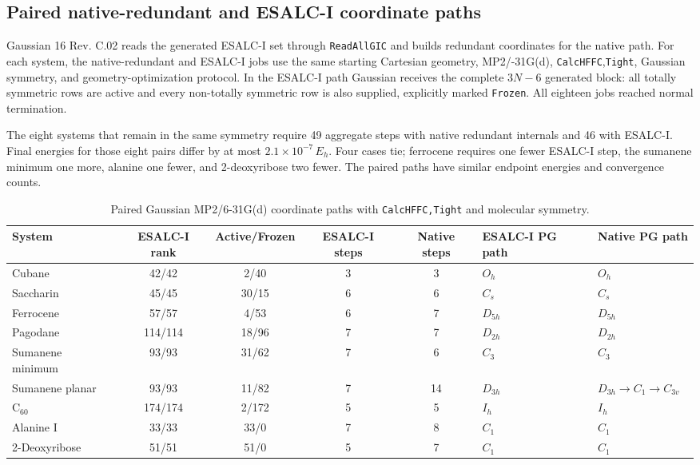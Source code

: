 \documentclass[10pt]{article}
\begin{document}
{\subsection{Paired native-redundant and ESALC-I coordinate paths}

Gaussian 16 Rev. C.02 reads the generated ESALC-I set through
\texttt{ReadAllGIC} and builds redundant coordinates for the native path.  For each
system, the native-redundant and ESALC-I jobs use the same
starting Cartesian geometry, MP2/-31G(d),
\texttt{CalcHFFC},\texttt{Tight}, Gaussian
symmetry, and geometry-optimization protocol.  In the ESALC-I path Gaussian receives the complete \(3N-6\) generated block: all totally symmetric
rows are active and every non-totally symmetric row is also supplied,
explicitly marked \texttt{Frozen}.  All eighteen jobs reached normal termination.

The eight systems that remain in the same symmetry require 49 aggregate steps
with native redundant internals and 46 with ESALC-I.
Final energies for those eight pairs differ by at most
\(2.1\times10^{-7}\,E_h\).  Four cases tie; ferrocene requires one fewer ESALC-I
step, the sumanene minimum one more, alanine one fewer, and 2-deoxyribose two fewer.
The paired paths have similar endpoint energies and convergence counts.

\begin{table}[htbp]
\centering
\scriptsize
\setlength{\tabcolsep}{3.0pt}
\caption{{Paired Gaussian MP2/6-31G(d) coordinate paths with
\texttt{CalcHFFC,Tight} and molecular symmetry.}}
\label{tab:gaussian-matched-coordinate-paths}
\begin{tabularx}{\linewidth}{@{}lccccXX@{}}
\toprule
System & ESALC-I rank & Active/Frozen & ESALC-I steps & Native steps &
ESALC-I PG path & Native PG path \\
\midrule
Cubane & 42/42 & 2/40 & 3 & 3 & \(O_h\) & \(O_h\) \\
Saccharin & 45/45 & 30/15 & 6 & 6 & \(C_s\) & \(C_s\) \\
Ferrocene & 57/57 & 4/53 & 6 & 7 & \(D_{5h}\) & \(D_{5h}\) \\
Pagodane & 114/114 & 18/96 & 7 & 7 & \(D_{2h}\) & \(D_{2h}\) \\
Sumanene minimum & 93/93 & 31/62 & 7 & 6 & \(C_3\) & \(C_3\) \\
Sumanene planar & 93/93 & 11/82 & 7 & 14 &
\(D_{3h}\) & \(D_{3h}\!\rightarrow C_1\!\rightarrow C_{3v}\) \\
C$_{60}$ & 174/174 & 2/172 & 5 & 5 & \(I_h\) & \(I_h\) \\
Alanine I & 33/33 & 33/0 & 7 & 8 & \(C_1\) & \(C_1\) \\
2-Deoxyribose & 51/51 & 51/0 & 5 & 7 & \(C_1\) & \(C_1\) \\
\bottomrule
\end{tabularx}
\end{table}

}
\end{document}
